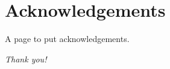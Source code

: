 \chapter*{Acknowledgements}
\doublespacing
A page to put acknowledgements.
\begin{flushright}
\textit{Thank you!}
\end{flushright}